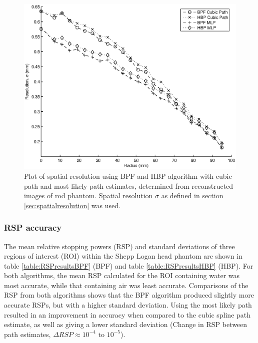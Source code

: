 \documentclass[11pt,a4paper]{article}
\begin{document}
\begin{figure}[!htb]
\centering
\includegraphics[scale=0.6]{img/resolution.eps}
\caption{Plot of spatial resolution using BPF and HBP algorithm with cubic path and most likely path estimates, determined from reconstructed images of rod phantom. Spatial resolution $\sigma$ as defined in section \ref{sec:spatialresolution} was used.}
\label{fig:resolution}
\end{figure}

\subsubsection{RSP accuracy}

The mean relative stopping powers (RSP) and standard deviations of three regions of interest (ROI) within the Shepp Logan head phantom are shown in table \ref{table:RSPresultsBPF} (BPF) and table \ref{table:RSPresultsHBP} (HBP). For both algorithms, the mean RSP calculated for the ROI containing water was most accurate, while that containing air was least accurate. Comparisons of the RSP from both algorithms shows that the BPF algorithm produced slightly more accurate RSPs, but with a higher standard deviation. Using the most likely path resulted in an improvement in accuracy when compared to the cubic spline path estimate, as well as giving a lower standard deviation (Change in RSP between path estimates, $\Delta RSP \approx 10^{-4} \text{ to } 10^{-5}$).
\end{document}
